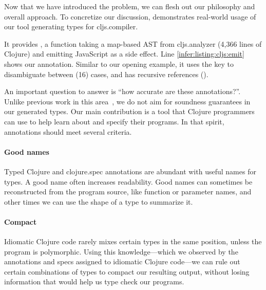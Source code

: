 \label{infer:sec:overview}

%

Now that we have introduced the problem,
we can flesh out our philosophy and overall
approach. To concretize our discussion,
 demonstrates real-world usage of our tool
generating types for cljs.compiler.

It provides , a function taking a map-based
AST from cljs.analyzer (4,366 lines of Clojure) and
emitting JavaScript as a side effect.
Line \ref{infer:listing:cljs:emit} shows our annotation.
%
Similar to our opening example, it uses the 
key to disambiguate between (16) cases, and has recursive
references ().




An important question to answer is ``how accurate are these annotations?''.
Unlike previous work in this area~\cite{An10dynamicinference}, we do not aim for soundness guarantees
in our generated types. 
Our main contribution is a tool that Clojure programmers
can use to help learn about and specify their programs.
In that spirit, annotations should meet several criteria.

\paragraph{Good names}
Typed Clojure and clojure.spec annotations are abundant
with useful names for types. A good name often increases
readability.
Good names can sometimes be reconstructed from the program source,
like function or parameter names, and other times 
we can use the shape of a type to summarize it.

\paragraph{Compact}
Idiomatic Clojure code rarely mixes certain types in the same position,
unless the program is polymorphic. Using this knowledge---which we observed
by the annotations and specs assigned to idiomatic Clojure 
code---we can rule out certain combinations of types to compact our
resulting output, without losing information that would help us
type check our programs.

